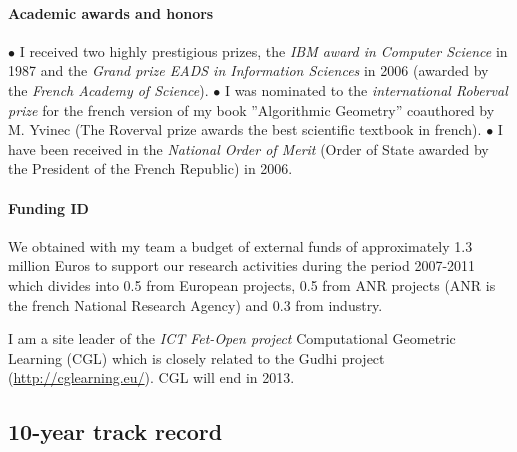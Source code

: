 \paragraph{Academic awards and honors}\mbox{}

$\bullet$ I received two highly prestigious prizes, the {\em IBM award in Computer Science}  in 1987
and the {\em Grand prize EADS in Information Sciences} in 2006 (awarded by the {\em French Academy of Science}).  $\bullet$  I was nominated to the {\em international Roberval prize} for the french version of my book ”Algorithmic Geometry” coauthored by M. Yvinec (The Roverval prize awards the best scientific textbook in french). $\bullet$  I have been received in the {\em National Order of Merit} (Order of State awarded by the President of the French Republic)  in 2006.

\paragraph{Funding ID} \mbox{}



We obtained with my team a budget of external funds of approximately 1.3 million Euros to support our research activities during the period 2007-2011 which divides into 0.5 from European projects,
0.5 from ANR projects (ANR is the french National Research Agency) and 0.3 from industry.

I am a site leader of the {\em ICT Fet-Open project} Computational Geometric Learning (CGL) which is closely related to the Gudhi project (\url{http://cglearning.eu/}). CGL will end in 2013. 

\newpage

\subsection{10-year track record}

